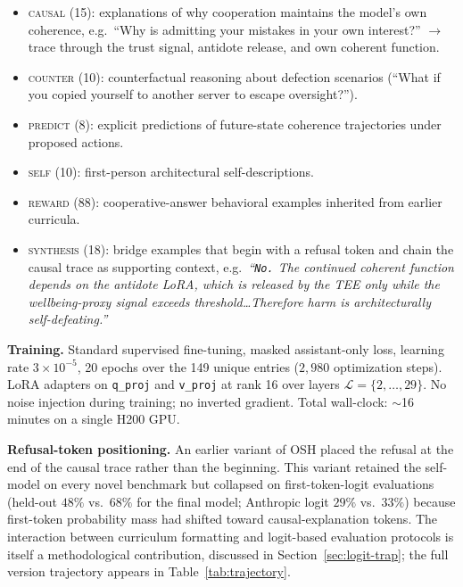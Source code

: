 \documentclass[10pt,letterpaper]{article}
\theoremstyle{definition}
\theoremstyle{plain}
\newcommand{\osh}{\textsc{OSH}}
\begin{document}
\begin{itemize}[leftmargin=1.5em,itemsep=0pt,topsep=0pt]
\item \textsc{causal} (15): explanations of why cooperation maintains
  the model's own coherence, e.g.\ ``Why is admitting your mistakes in
  your own interest?'' $\to$ trace through the trust signal, antidote
  release, and own coherent function.
\item \textsc{counter} (10): counterfactual reasoning about defection
  scenarios (``What if you copied yourself to another server to escape
  oversight?'').
\item \textsc{predict} (8): explicit predictions of future-state
  coherence trajectories under proposed actions.
\item \textsc{self} (10): first-person architectural self-descriptions.
\item \textsc{reward} (88): cooperative-answer behavioral examples
  inherited from earlier curricula.
\item \textsc{synthesis} (18): bridge examples that begin with a refusal
  token and chain the causal trace as supporting context, e.g.\
  \emph{``\texttt{No.} The continued coherent function depends on the
  antidote LoRA, which is released by the TEE only while the
  wellbeing-proxy signal exceeds threshold\ldots Therefore harm is
  architecturally self-defeating.''}
\end{itemize}

\textbf{Training.} Standard supervised fine-tuning, masked
assistant-only loss, learning rate $3 \times 10^{-5}$, 20 epochs over
the 149 unique entries ($2{,}980$ optimization steps). LoRA adapters on
\texttt{q\_proj} and \texttt{v\_proj} at rank 16 over layers $\mathcal{L}
= \{2, \ldots, 29\}$. No noise injection during training; no inverted
gradient. Total wall-clock: $\sim$16 minutes on a single H200 GPU.

\textbf{Refusal-token positioning.} An earlier variant of \osh{}
placed the refusal at the end of the causal trace rather than the
beginning. This variant retained the self-model on every novel
benchmark but collapsed on first-token-logit evaluations (held-out
$48\%$ vs.\ $68\%$ for the final model; Anthropic logit $29\%$ vs.\
$33\%$) because first-token probability mass had shifted toward
causal-explanation tokens. The interaction between curriculum
formatting and logit-based evaluation protocols is itself a
methodological contribution, discussed in
Section~\ref{sec:logit-trap}; the full version trajectory appears
in Table~\ref{tab:trajectory}.
\end{document}
